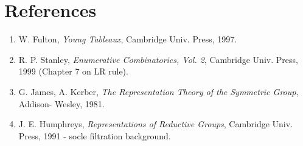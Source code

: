 \documentclass[a4paper,12pt]{article}
\begin{document}
\section*{References}
\begin{enumerate}
\item W. Fulton, \emph{Young Tableaux}, Cambridge Univ. Press, 1997.
\item R. P. Stanley, \emph{Enumerative Combinatorics, Vol. 2},
      Cambridge Univ. Press, 1999 (Chapter 7 on LR rule).
\item G. James, A. Kerber, \emph{The Representation Theory of the Symmetric Group},
      Addison- Wesley, 1981.
\item J. E. Humphreys, \emph{Representations of Reductive Groups},
      Cambridge Univ. Press, 1991 -  socle filtration background.
\end{enumerate}
\end{document}
